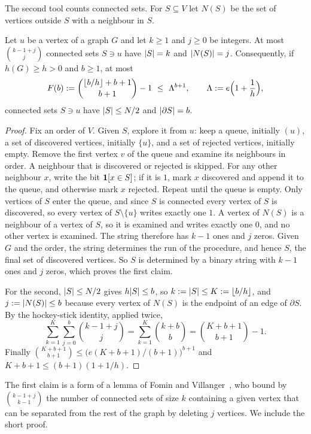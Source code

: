 The second tool counts connected sets. For $S\subseteq V$ let $N(S)$ be the set of vertices outside $S$ with a neighbour in $S$.

\begin{lemma}\label{lem:count}
Let $u$ be a vertex of a graph $G$ and let $k\ge1$ and $j\ge0$ be integers. At most $\binom{k-1+j}{j}$ connected sets $S\ni u$ have $\lvert S\rvert=k$ and $\lvert N(S)\rvert=j$. Consequently, if $h(G)\ge h>0$ and $b\ge1$, at most
\[
  F(b):=\binom{\lfloor b/h\rfloor+b+1}{b+1}-1\ \le\ \Lambda^{b+1},\qquad\Lambda:=e\Bigl(1+\frac1h\Bigr),
\]
connected sets $S\ni u$ have $\lvert S\rvert\le N/2$ and $\lvert \partial S\rvert=b$.
\end{lemma}

\begin{proof}
Fix an order of $V$. Given $S$, explore it from $u$: keep a queue, initially $(u)$, a set of discovered vertices, initially $\{u\}$, and a set of rejected vertices, initially empty. Remove the first vertex $v$ of the queue and examine its neighbours in order. A neighbour that is discovered or rejected is skipped. For any other neighbour $x$, write the bit $\mathbf{1}[x\in S]$; if it is $1$, mark $x$ discovered and append it to the queue, and otherwise mark $x$ rejected. Repeat until the queue is empty. Only vertices of $S$ enter the queue, and since $S$ is connected every vertex of $S$ is discovered, so every vertex of $S\setminus\{u\}$ writes exactly one $1$. A vertex of $N(S)$ is a neighbour of a vertex of $S$, so it is examined and writes exactly one $0$, and no other vertex is examined. The string therefore has $k-1$ ones and $j$ zeros. Given $G$ and the order, the string determines the run of the procedure, and hence $S$, the final set of discovered vertices. So $S$ is determined by a binary string with $k-1$ ones and $j$ zeros, which proves the first claim.

For the second, $\lvert S\rvert\le N/2$ gives $h\lvert S\rvert\le b$, so $k:=\lvert S\rvert\le K:=\lfloor b/h\rfloor$, and $j:=\lvert N(S)\rvert\le b$ because every vertex of $N(S)$ is the endpoint of an edge of $\partial S$. By the hockey-stick identity, applied twice,
\[
  \sum_{k=1}^{K}\sum_{j=0}^{b}\binom{k-1+j}{j}=\sum_{k=1}^K\binom{k+b}{b}=\binom{K+b+1}{b+1}-1 .
\]
Finally $\binom{K+b+1}{b+1}\le\bigl(e(K+b+1)/(b+1)\bigr)^{b+1}$ and $K+b+1\le(b+1)(1+1/h)$.
\end{proof}

The first claim is a form of a lemma of Fomin and Villanger~\cite{FominVillanger12}, who bound by $\binom{k-1+j}{k-1}$ the number of connected sets of size $k$ containing a given vertex that can be separated from the rest of the graph by deleting $j$ vertices. We include the short proof.

